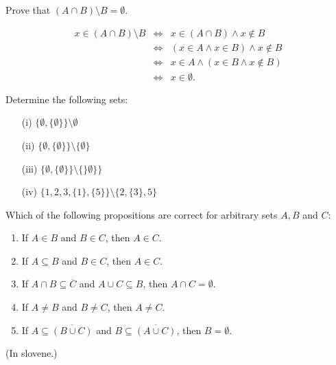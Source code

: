 \documentclass[11pt,paper=b5,footinclude,headinclude]{scrbook} %
\theoremstyle{remark}
\theoremstyle{definition} %
\theoremstyle{theorem} %
\newtheorem{ex}{Exercise\hypertarget{sol:\theex}}[chapter]
\begin{document}
\begin{ex}Prove that $(A\cap B )\setminus B = \emptyset$.
\begin{sol}
    
\begin{eqnarray*}
x\in (A\cap B )\setminus B  &\Leftrightarrow & x \in (A\cap B)  \wedge x\notin B\\
&\Leftrightarrow & (x\in A\wedge x\in  B ) \wedge x\notin B\\
&\Leftrightarrow & x\in A\wedge (x\in  B  \wedge x\notin B)\\
&\Leftrightarrow & x\in \emptyset.
\end{eqnarray*}
\end{sol}

\end{ex}
\begin{ex}Determine the following sets:
\begin{enumerate}
\item[(i)] $\{\emptyset, \{\emptyset\}\}\setminus \emptyset$ \quad [$\{\emptyset, \{\emptyset\}\}$]
\item[(ii)] $\{\emptyset, \{\emptyset\}\}\setminus \{\emptyset\}$
\item[(iii)] $\{\emptyset, \{\emptyset\}\}\setminus \{\}\emptyset\}\}$
\item[(iv)] $\{1,2,3,\{1\}, \{5\}  \}\setminus \{2,\{3\},5\}$
\end{enumerate}

\end{ex} \begin{ex}Which of the following propositions are correct for arbitrary sets $A, B$ and $C$:
\begin{enumerate}
\item If $A\in B$ and $B\in C$, then $A\in C$.
\item If $A\subseteq B$ and $B\in C$, then $A\in C$.
\item If $A\cap B\subseteq \overline{C}$ and $A\cup C \subseteq B$, then $A\cap C = \emptyset$.
\item If $A\neq B$ and $B\neq C$, then $A\neq C$.
\item If $A\subseteq \overline{(B\cup C)}$ and $B\subseteq \overline{(A\cup C)}$, then $B=\emptyset$.
\end{enumerate}

\begin{sol} (In slovene.)
    

\end{sol}
\end{ex}
\end{document}
